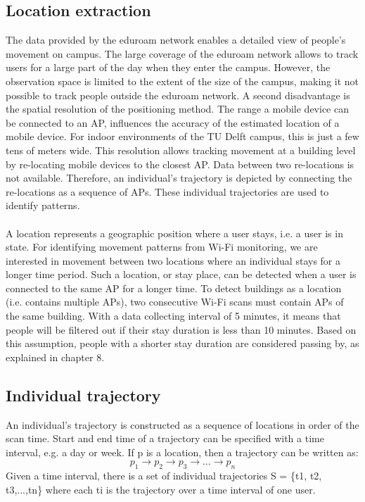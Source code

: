 \subsection{Location extraction}
The data provided by the eduroam network enables a detailed view of people’s movement on campus. The large coverage of the eduroam network allows to track users for a large part of the day when they enter the campus. However, the observation space is limited to the extent of the size of the campus, making it not possible to track people outside the eduroam network. A second disadvantage is the spatial resolution of the positioning method. The range a mobile device can be connected to an AP,  influences the accuracy of the estimated location of a mobile device. For indoor environments of the TU Delft campus, this is just a few tens of meters wide. This resolution allows tracking movement at a building level by re-locating mobile devices to the closest AP. Data between two re-locations is not available. Therefore, an individual’s trajectory is depicted by connecting the re-locations as a sequence of APs. These individual trajectories are used to identify patterns. \\\\
A location represents a geographic position where a user stays, i.e. a user is in state. For identifying movement patterns from Wi-Fi monitoring, we are interested in movement between two locations where an individual stays for a longer time period. Such a location, or stay place, can be detected when a user is connected to the same AP for a longer time. To detect  buildings as a location (i.e. contains multiple APs), two consecutive Wi-Fi scans must contain  APs of the same building. With a data collecting interval of 5 minutes, it means that people will be filtered out if their stay duration is less than 10 minutes. Based on this assumption, people with a shorter stay duration are considered passing by, as explained in chapter 8.

\subsection{Individual trajectory}
An individual’s trajectory is constructed as a sequence of locations in order of the scan time. Start and end time of a trajectory can be specified with a time interval, e.g. a day or week. If p is a location, then a trajectory can be written as:
$$p_{1} \rightarrow p_{2} \rightarrow p_{3} \rightarrow …\rightarrow p_{n}$$
Given a time interval, there is a set of individual trajectories S = \{t1, t2, t3,...,tn\} where each ti is the trajectory over a time interval of one user. 

